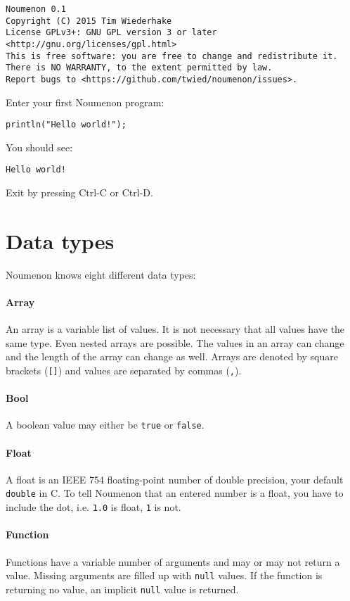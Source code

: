 \documentclass[a4paper, parskip, 10pt]{scrartcl}
\begin{document}
\begin{lstlisting}[language={}]
Noumenon 0.1
Copyright (C) 2015 Tim Wiederhake
License GPLv3+: GNU GPL version 3 or later <http://gnu.org/licenses/gpl.html>
This is free software: you are free to change and redistribute it.
There is NO WARRANTY, to the extent permitted by law.
Report bugs to <https://github.com/twied/noumenon/issues>.
\end{lstlisting}

Enter your first Noumenon program:

\begin{lstlisting}
println("Hello world!");
\end{lstlisting}

You should see:
\begin{lstlisting}
Hello world!
\end{lstlisting}

Exit by pressing Ctrl-C or Ctrl-D.

\section{Data types}
Noumenon knows eight different data types:

\paragraph{Array} An array is a variable list of values. It is not necessary
that all values have the same type. Even nested arrays are possible. The values
in an array can change and the length of the array can change as well. Arrays
are denoted by square brackets (\texttt{[]}) and values are separated by commas
(\texttt{,}).

\paragraph{Bool} A boolean value may either be \texttt{true} or \texttt{false}.

\paragraph{Float} A float is an IEEE 754 floating-point number of double
precision, your default \texttt{double} in C. To tell Noumenon that an entered
number is a float, you have to include the dot, i.e. \texttt{1.0} is float,
\texttt{1} is not.

\paragraph{Function} Functions have a variable number of arguments and may or
may not return a value. Missing arguments are filled up with \texttt{null}
values. If the function is returning no value, an implicit \texttt{null} value
is returned.
\end{document}
